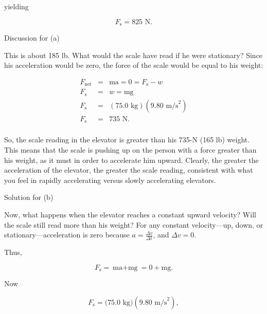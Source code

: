 \documentclass[
]{book}
\newenvironment{tinysection}{}{}
\begin{document}
yielding

\leavevmode\hypertarget{eip-id1707818}{}%
\[{{F_{\text{s}} = 8}\text{25\ N}}.\]

\begin{tinysection}

{Discussion for (a)}

\end{tinysection}

This is about 185 lb. What would the scale have read if he were
stationary? Since his acceleration would be zero, the force of the scale
would be equal to his weight:

\leavevmode\hypertarget{eip-id2384618}{}%
\[\begin{array}{lll}
F_{\text{net}} & = & {\text{ma} = 0 = {F_{\text{s}} - w}} \\
F_{\text{s}} & = & {w = \text{mg}} \\
F_{\text{s}} & = & {(\text{75.0\ kg})(9.\text{80\ m/s}^{2})} \\
F_{\text{s}} & = & \text{735\ N.} \\
\end{array}\]

So, the scale reading in the elevator is greater than his 735-N (165 lb)
weight. This means that the scale is pushing up on the person with a
force greater than his weight, as it must in order to accelerate him
upward. Clearly, the greater the acceleration of the elevator, the
greater the scale reading, consistent with what you feel in rapidly
accelerating versus slowly accelerating elevators.

\begin{tinysection}

{Solution for (b)}

\end{tinysection}

Now, what happens when the elevator reaches a constant upward velocity?
Will the scale still read more than his weight? For any constant
velocity---up, down, or stationary---acceleration is zero because
\({a = \frac{\Delta v}{\Delta t}}{}\), and \({\Delta v = 0}{}\).

Thus,

\leavevmode\hypertarget{eip-id2587837}{}%
\[{{F_{\text{s}} = {\text{ma} + \text{mg}}} = {0 + \text{mg}}}.\]

Now

\leavevmode\hypertarget{eip-id1546720}{}%
\[{{F_{\text{s}} = (}\text{75}\text{.}\text{0\ kg})(9\text{.}\text{80\ m/s}^{2})},\]
\end{document}
